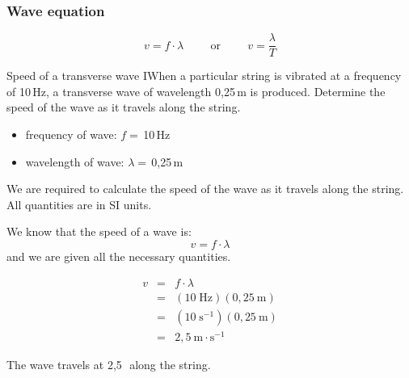 \subsubsection{Wave equation}
\begin{equation*}\nonumber
    \boxed{v = f\cdot \lambda}\hspace{1cm}\text{or}\hspace{1cm} \boxed{v = \frac{\lambda }{T}}
      \end{equation*}

\begin{wex}{Speed of a transverse wave I}{When a particular string is vibrated at a frequency of 10\,Hz, a transverse wave of wavelength 0,25\,m is produced. Determine the speed of the wave as it travels along the string.}
{
\begin{itemize}
\item{frequency of wave: $f=$\,10\,Hz}
\item{wavelength of wave: $\lambda=$\,0,25\,m}
\end{itemize}
We are required to calculate the speed of the wave as it travels along the string. All quantities are in SI units.

We know that the speed of a wave is:
\begin{equation*}
v=f\cdot \lambda 
\end{equation*}
and we are given all the necessary quantities.

\begin{eqnarray*}
v&=&f\cdot \lambda\\
&=&(10\;\text{Hz})(0,25~\text{m})\\
&=&(10\;\text{s}^{-1})(0,25~\text{m})\\
&=&2,5~\text{m} \cdot \text{s}^{-1}
\end{eqnarray*}

The wave travels at 2,5\,\ms\ along the string.
}
\end{wex}


